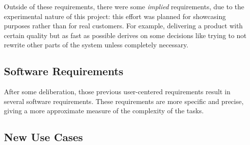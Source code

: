 Outside of these requirements, there were some \emph{implied} requirements, due to the experimental nature of this project: this effort was planned for showcasing purposes rather than for real customers.
For example, delivering a product with certain quality but as fast as possible derives on some decisions like trying to not rewrite other parts of the system unless completely necessary.


\subsection{Software Requirements} %
\label{sub:software_requirements}

After some deliberation, those previous user-centered requirements result in several software requirements.
These requirements are more specific and precise, giving a more approximate measure of the complexity of the tasks.

\begin{center}
  \begin{softwarerequirement}
    \label{tab:requirementapplet}%
  \end{softwarerequirement}
\end{center}


\subsection{New Use Cases} %
\label{sub:new_use_cases}


